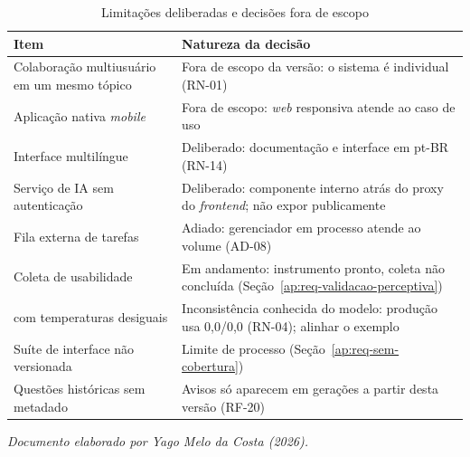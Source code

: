 \begin{table}[H]
\centering
\setlength{\tabcolsep}{3pt}
\caption{Limitações deliberadas e decisões fora de escopo}
\label{tab:req-limitacoes}
\begin{tabularx}{\textwidth}{|L{5.2cm}|Y|}
\hline
\textbf{Item} & \textbf{Natureza da decisão} \\
\hline
Colaboração multiusuário em um mesmo tópico & Fora de escopo da versão: o sistema é individual (RN-01) \\
\hline
Aplicação nativa \emph{mobile} & Fora de escopo: \emph{web} responsiva atende ao caso de uso \\
\hline
Interface multilíngue & Deliberado: documentação e interface em pt-BR (RN-14) \\
\hline
Serviço de IA sem autenticação & Deliberado: componente interno atrás do proxy do \emph{frontend}; não expor publicamente \\
\hline
Fila externa de tarefas & Adiado: gerenciador em processo atende ao volume (AD-08) \\
\hline
Coleta de usabilidade & Em andamento: instrumento pronto, coleta não concluída (Seção~\ref{ap:req-validacao-perceptiva}) \\
\hline
\texttt{} com temperaturas desiguais & Inconsistência conhecida do modelo: produção usa 0,0/0,0 (RN-04); alinhar o exemplo \\
\hline
Suíte de interface não versionada & Limite de processo (Seção~\ref{ap:req-sem-cobertura}) \\
\hline
Questões históricas sem metadado \texttt{} & Avisos só aparecem em gerações a partir desta versão (RF-20) \\
\hline
\end{tabularx}
\end{table}

\noindent\textit{Documento elaborado por Yago Melo da Costa (2026).}

